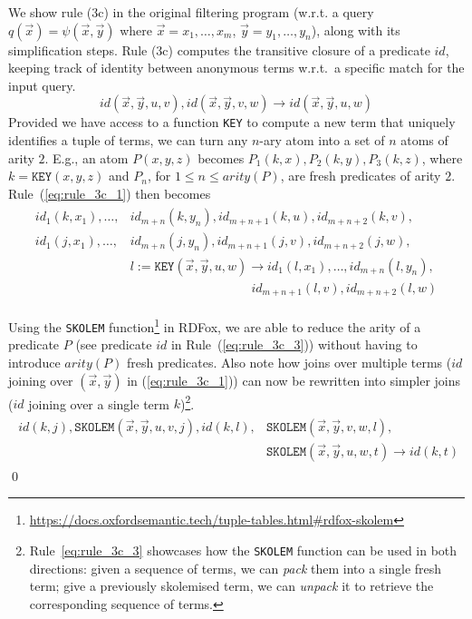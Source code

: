 \documentclass[runningheads]{llncs}
\newcommand{\rdfox}{\mbox{RDFox}\xspace}
\begin{document}
\begin{example}
    We show rule (3c) in the original filtering program (w.r.t. a query $q(\vec{x}) = \psi(\vec{x}, \vec{y})$ where $\vec{x} = x_1, \dots, x_m$, $\vec{y} = y_1, \dots, y_n$), along with its simplification steps.
    Rule (3c) computes the transitive closure of a predicate $id$, keeping track of identity between anonymous terms w.r.t.\ a specific match for the input query.
    \begin{equation}\label{eq:rule_3c_1}
        id(\vec{x},\vec{y},u,v), id(\vec{x},\vec{y},v,w) \rightarrow id(\vec{x},\vec{y},u,w)
    \end{equation}
    Provided we have access to a function \texttt{KEY} to compute a new term that uniquely identifies a tuple of terms, we can turn any $n$-ary atom into a set of $n$ atoms of arity $2$.
    E.g., an atom $P(x, y, z)$ becomes $P_1(k, x), P_2(k, y), P_3(k, z)$, where $k = \texttt{KEY}(x, y, z)$ and $P_n$, for $1 \le n \le arity(P)$, are fresh predicates of arity $2$.
    Rule~(\ref{eq:rule_3c_1}) then becomes
    \begin{align}
    \begin{split}
        id_1(k, x_1), \dots, &id_{m + n}(k, y_{n}), id_{m + n + 1}(k, u), id_{m + n + 2}(k, v), \\
        id_1(j, x_1), \dots, &id_{m + n}(j, y_{n}), id_{m + n + 1}(j, v), id_{m + n + 2}(j, w), \\
                                                   &l := \texttt{KEY}(\vec{x},\vec{y},u,w) \rightarrow id_1(l, x_1), \dots, id_{m + n}(l, y_{n}), \\
                                                   &\;\;\quad\qquad\qquad\qquad\qquad id_{m+n+1}(l, v), id_{m+n+2}(l, w)
    \end{split}
    \end{align}

    Using the \texttt{SKOLEM} function\footnote{\url{https://docs.oxfordsemantic.tech/tuple-tables.html\#rdfox-skolem}} in \rdfox, we are able to reduce the arity of a predicate $P$ (see predicate $id$ in Rule~(\ref{eq:rule_3c_3})) without having to introduce $arity(P)$ fresh predicates.
    Also note how joins over multiple terms ($id$ joining over $(\vec{x}, \vec{y})$ in (\ref{eq:rule_3c_1})) can now be rewritten into simpler joins ($id$ joining over a single term $k$)\footnote{Rule~\ref{eq:rule_3c_3} showcases how the \texttt{SKOLEM} function can be used in both directions: given a sequence of terms, we can \emph{pack} them into a single fresh term; give a previously skolemised term, we can \emph{unpack} it to retrieve the corresponding sequence of terms.}.
    \begin{align}\label{eq:rule_3c_3}
    \begin{split}
        id(k,j), \texttt{SKOLEM}(\vec{x},\vec{y},u,v,j), id(k,l), &\texttt{SKOLEM}(\vec{x},\vec{y},v,w,l), \\
                                                                  &\texttt{SKOLEM}(\vec{x},\vec{y},u,w,t) \rightarrow id(k,t)
    \end{split}
    \end{align}
    \qed
\end{example}
\end{document}
